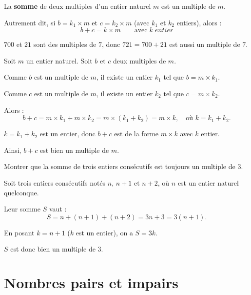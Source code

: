 \begin{propriete}
	La \textbf{somme} de deux multiples d'un entier naturel $m$ est un multiple de $m$.

	Autrement dit, si $b = k_1 \times m$ et $c = k_2 \times m$ (avec $k_1$ et $k_2$ entiers), alors :
	\[
		b + c = k \times m\qquad \text{avec}\; k\; {entier}
	\]
\end{propriete}

\begin{exemple}
	$700$ et $21$ sont des multiples de $7$, donc $721 = 700 + 21$ est aussi un multiple de $7$.
\end{exemple}

\begin{demo}
	Soit $m$ un entier naturel. Soit $b$ et $c$ deux multiples de $m$.

	Comme $b$ est un multiple de $m$, il existe un entier $k_1$ tel que $b = m \times k_1$.

	Comme $c$ est un multiple de $m$, il existe un entier $k_2$ tel que $c = m \times k_2$.

	Alors :
	\[
		b + c = m \times k_1 + m \times k_2 = m \times (k_1 + k_2) = m \times k, \quad \text{où } k = k_1 + k_2.
	\]

	$k = k_1 + k_2$ est un entier, donc $b + c$ est de la forme $m \times k$ avec $k$ entier.

	Ainsi, $b + c$ est bien un multiple de $m$.
\end{demo}

\newpage

\begin{methode}
	Montrer que la somme de trois entiers consécutifs est toujours un multiple de $3$.

	\begin{correction}
		Soit trois entiers consécutifs notés $n$, $n + 1$ et $n + 2$, où $n$ est un entier naturel quelconque.

		Leur somme $S$ vaut :
		\[
			S = n + (n + 1) + (n + 2) = 3n + 3 = 3(n + 1).
		\]

		En posant $k = n + 1$ ($k$ est un entier), on a $S = 3k$.

		$S$ est donc bien un multiple de $3$.
	\end{correction}
\end{methode}

\section{Nombres pairs et impairs}


